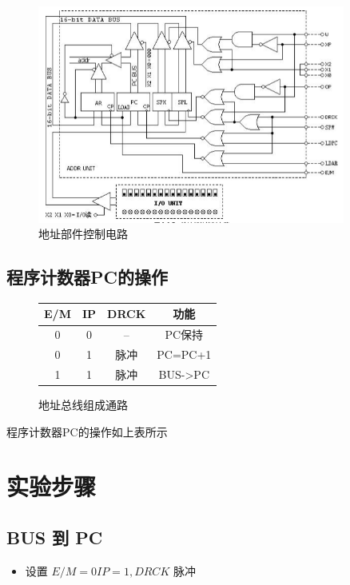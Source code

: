 \documentclass[a4paper,10pt,UTF8]{paper}
\numberwithin{equation}{section}
\numberwithin{figure}{section}
\begin{document}
\begin{figure}[h]
  \centering
  \includegraphics[width=0.9\textwidth]{2.PNG}
  \caption{地址部件控制电路}
  \label{fig:2}
\end{figure}

\subsection{程序计数器PC的操作}
\begin{figure}[h]
  \centering
  \begin{tabular}{|c|c|c|c|}
    \hline
    E/M & IP & DRCK & 功能 \\
    \hline
    0 & 0 & -- & PC保持 \\
    \hline
    0 & 1 & 脉冲 & PC=PC+1 \\
    \hline
    1 & 1 & 脉冲 & BUS->PC \\
    \hline
  \end{tabular}
  \caption{地址总线组成通路}
  \label{fig:3}
\end{figure}


程序计数器PC的操作如上表所示

\section{实验步骤}

\subsection{BUS 到 PC}

\begin{itemize}
  \item 设置 $E/M=0 IP=1, DRCK$ 脉冲
\end{itemize}
\end{document}
